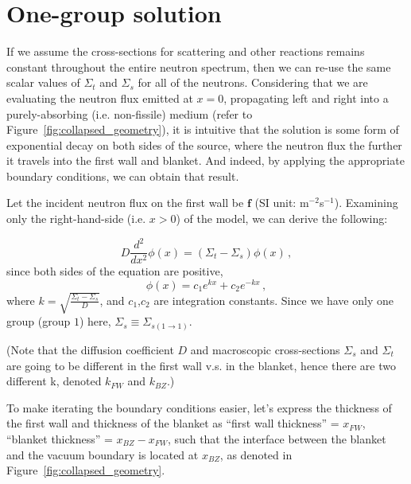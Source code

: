 \documentclass[a4paper, 12pt]{article}
\begin{document}
\section{One-group solution}
If we assume the cross-sections for scattering and other reactions remains constant throughout the entire neutron spectrum, then we can re-use the same scalar values of $\Sigma_t$ and $\Sigma_s$ for all of the neutrons. Considering that we are evaluating the neutron flux emitted at $x=0$, propagating left and right into a purely-absorbing (i.e. non-fissile) medium (refer to Figure~\ref{fig:collapsed_geometry}), it is intuitive that the solution is some form of exponential decay on both sides of the source, where the neutron flux the further it travels into the first wall and blanket. And indeed, by applying the appropriate boundary conditions, we can obtain that result.

Let the incident neutron flux on the first wall be $\boldsymbol{f}$ (SI unit: m$^{-2}$s$^{-1}$). Examining only the right-hand-side (i.e. $x>0$) of the model, we can derive the following:

\begin{equation}
    D \frac{d^2}{dx^2}\phi(x) = (\Sigma_t - \Sigma_s) \phi(x)\,,
\end{equation}
since both sides of the equation are positive,
\begin{equation}
    \phi(x) = c_1 e^{kx} + c_2 e^{-kx}\,,
\end{equation}
where $k=\sqrt{\frac{\Sigma_t-\Sigma_s}{D}}$, and $c_1$,$c_2$ are integration constants.
Since we have only one group (group $1$) here, $\Sigma_s\equiv \Sigma_{s(1\rightarrow1)}$.

(Note that the diffusion coefficient $D$ and macroscopic cross-sections $\Sigma_s$ and $\Sigma_t$ are going to be different in the first wall v.s. in the blanket, hence there are two different k, denoted $k_{FW}$ and $k_{BZ}$.)

To make iterating the boundary conditions easier, let's express the thickness of the first wall and thickness of the blanket as ``first wall thickness'' = $x_{FW}$, ``blanket thickness'' = $x_{BZ} - x_{FW}$, such that the interface between the blanket and the vacuum boundary is located at $x_{BZ}$, as denoted in Figure~\ref{fig:collapsed_geometry}.
\end{document}
